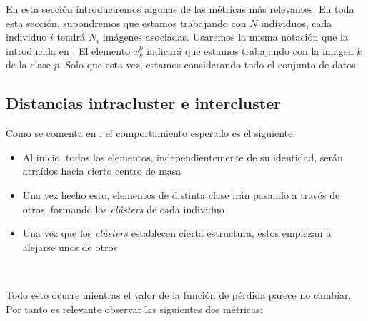 En esta sección introduciremos algunas de las métricas más relevantes. En toda esta sección, supondremos que estamos trabajando con $N$ individuos, cada individuo $i$ tendrá $N_i$ imágenes asociadas. Usaremos la misma notación que la introducida en . El elemento $x_k^p$ indicará que estamos trabajando con la imagen $k$ de la clase $p$. Solo que esta vez, estamos considerando todo el conjunto de datos.


\subsection{Distancias intracluster e intercluster} \label{isubs:teoria_distancia_intra_inter_cluster}

Como se comenta en \cite{informatica:paper_cacd}, el comportamiento esperado es el siguiente:

\begin{itemize}
    \item Al inicio, todos los elementos, independientemente de su identidad, serán atraídos hacia cierto centro de masa
    \item Una vez hecho esto, elementos de distinta clase irán pasando a través de otros, formando los \textit{clústers} de cada individuo
    \item Una vez que los \textit{clústers} establecen cierta estructura, estos empiezan a alejarse unos de otros
\end{itemize}\

Todo esto ocurre mientras el valor de la función de pérdida parece no cambiar. Por tanto es relevante observar las siguientes dos métricas:

